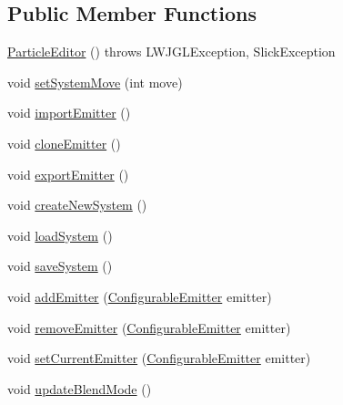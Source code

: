\subsection*{Public Member Functions}
\begin{DoxyCompactItemize}
\item 
\mbox{\hyperlink{classorg_1_1newdawn_1_1slick_1_1tools_1_1peditor_1_1_particle_editor_a2e3d19ba973d23e1cf009aa706c8aa28}{Particle\+Editor}} ()  throws L\+W\+J\+G\+L\+Exception, Slick\+Exception 
\item 
void \mbox{\hyperlink{classorg_1_1newdawn_1_1slick_1_1tools_1_1peditor_1_1_particle_editor_a52eae40771f51d69dd3a774af5c2e9ab}{set\+System\+Move}} (int move)
\item 
void \mbox{\hyperlink{classorg_1_1newdawn_1_1slick_1_1tools_1_1peditor_1_1_particle_editor_a8afbd02f370ac64f0b5b3ec8e985c0ca}{import\+Emitter}} ()
\item 
void \mbox{\hyperlink{classorg_1_1newdawn_1_1slick_1_1tools_1_1peditor_1_1_particle_editor_ae5e67a46f5684d247709efdda588fad0}{clone\+Emitter}} ()
\item 
void \mbox{\hyperlink{classorg_1_1newdawn_1_1slick_1_1tools_1_1peditor_1_1_particle_editor_adb6089bb9e66a806b8396859cf45a319}{export\+Emitter}} ()
\item 
void \mbox{\hyperlink{classorg_1_1newdawn_1_1slick_1_1tools_1_1peditor_1_1_particle_editor_a7f1ea102c18f468310a5fb4371759d71}{create\+New\+System}} ()
\item 
void \mbox{\hyperlink{classorg_1_1newdawn_1_1slick_1_1tools_1_1peditor_1_1_particle_editor_a1a44d75dc7c9e51006cde8bc44a5ad29}{load\+System}} ()
\item 
void \mbox{\hyperlink{classorg_1_1newdawn_1_1slick_1_1tools_1_1peditor_1_1_particle_editor_a450ed64af5f1d5d24acd03e09d1faed5}{save\+System}} ()
\item 
void \mbox{\hyperlink{classorg_1_1newdawn_1_1slick_1_1tools_1_1peditor_1_1_particle_editor_a629e50ff72b6441ac93f15ae64073f2c}{add\+Emitter}} (\mbox{\hyperlink{classorg_1_1newdawn_1_1slick_1_1particles_1_1_configurable_emitter}{Configurable\+Emitter}} emitter)
\item 
void \mbox{\hyperlink{classorg_1_1newdawn_1_1slick_1_1tools_1_1peditor_1_1_particle_editor_a14f3cf420a632f5d7a625de991f07f70}{remove\+Emitter}} (\mbox{\hyperlink{classorg_1_1newdawn_1_1slick_1_1particles_1_1_configurable_emitter}{Configurable\+Emitter}} emitter)
\item 
void \mbox{\hyperlink{classorg_1_1newdawn_1_1slick_1_1tools_1_1peditor_1_1_particle_editor_a1936b46c570aed7d928859f70f04e890}{set\+Current\+Emitter}} (\mbox{\hyperlink{classorg_1_1newdawn_1_1slick_1_1particles_1_1_configurable_emitter}{Configurable\+Emitter}} emitter)
\item 
void \mbox{\hyperlink{classorg_1_1newdawn_1_1slick_1_1tools_1_1peditor_1_1_particle_editor_a052734751c1a77ad1c94dcd161fff993}{update\+Blend\+Mode}} ()
\end{DoxyCompactItemize}
